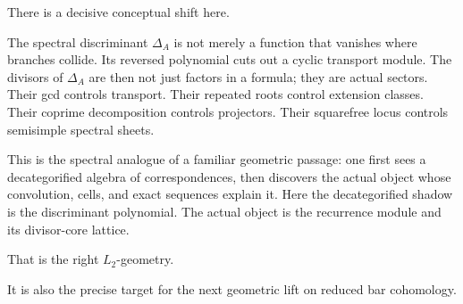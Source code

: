 There is a decisive conceptual shift here.

The spectral discriminant \(\Delta_A\) is not merely a function that vanishes where branches collide.
Its reversed polynomial cuts out a cyclic transport module.
The divisors of \(\Delta_A\) are then not just factors in a formula; they are actual sectors.
Their gcd controls transport.
Their repeated roots control extension classes.
Their coprime decomposition controls projectors.
Their squarefree locus controls semisimple spectral sheets.

This is the spectral analogue of a familiar geometric passage:
one first sees a decategorified algebra of correspondences, then discovers the actual object
whose convolution, cells, and exact sequences explain it.
Here the decategorified shadow is the discriminant polynomial.
The actual object is the recurrence module and its divisor-core lattice.

That is the right \(L_2\)-geometry.

It is also the precise target for the next geometric lift on reduced bar cohomology.

